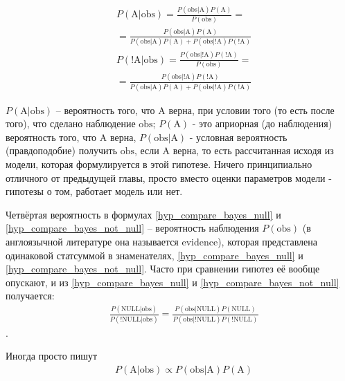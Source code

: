 \documentclass{book}
\begin{document}
\begin{align}\label{hyp_compare_bayes_A}
   &P\left(\text{A|obs}\right)=
   \frac{P\left(\text{obs|A}\right) P\left(\text{A}\right)}{P\left(\text{obs}\right)} = \nonumber \\
   &=\frac{P\left(\text{obs|A}\right) P\left(\text{A}\right)}{P\left(\text{obs|A}\right) P\left(\text{A}\right)+P\left(\text{obs|!A}\right) P\left(\text{!A}\right)} 
\end{align}
\begin{align}\label{hyp_compare_bayes_not_A}
   &P\left(\text{!A|obs}\right)=
   \frac{P\left(\text{obs|!A}\right) P\left(\text{!A}\right)}{P\left(\text{obs}\right)} = \nonumber \\
   &=\frac{P\left(\text{obs|!A}\right) P\left(\text{!A}\right)}{P\left(\text{obs|A}\right) P\left(\text{A}\right)+P\left(\text{obs|!A}\right) P\left(\text{!A}\right)}
\end{align}


$P\left(\text{A|obs}\right)$ -- вероятность того, что $\text{A}$ верна, при условии того (то есть после того), что сделано наблюдение $\text{obs}$; $P\left(\text{A}\right)$ - это априорная (до наблюдения) вероятность того, что $\text{A}$ верна, $P\left(\text{obs|A}\right)$ - условная вероятность (правдоподобие) получить $\text{obs}$, если $\text{A}$ верна, то есть рассчитанная исходя из модели, которая формулируется в этой гипотезе. Ничего принципиально отличного от предыдущей главы, просто вместо оценки параметров модели - гипотезы о том, работает модель или нет.

Четвёртая вероятность в формулах \eqref{hyp_compare_bayes_null} и \eqref{hyp_compare_bayes_not_null} -- вероятность наблюдения $P\left(\text{obs}\right)$ (в англоязычной литературе она называется evidence), которая представлена одинаковой статсуммой в знаменателях, \eqref{hyp_compare_bayes_null} и \eqref{hyp_compare_bayes_not_null}. Часто при сравнении гипотез её вообще опускают, и из \eqref{hyp_compare_bayes_null} и \eqref{hyp_compare_bayes_not_null} получается:
\begin{align}\label{hyp_compare_bayes_comp}
   &\frac{P\left(\text{NULL|obs}\right)}{P\left(\text{!NULL|obs}\right)}=\frac{P\left(\text{obs|NULL}\right) P\left(\text{NULL}\right)}{P\left(\text{obs|!NULL}\right) P\left(\text{!NULL}\right)}
\end{align}.

Иногда просто пишут 
\begin{align}\label{hyp_compare_bayes_null_prop}
   &P\left(\text{A|obs}\right)\propto P\left(\text{obs|A}\right) P\left(\text{A}\right)
\end{align}
\end{document}
